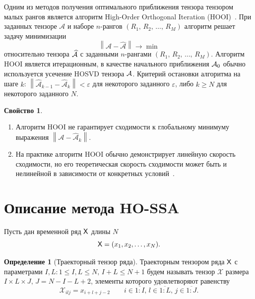 \documentclass[specialist,
    substylefile = spbu.rtx,
    subf,href,colorlinks=true, 12pt]{disser}
\theoremstyle{plain}
\theoremstyle{definition}
\newtheorem{definition}{Определение}[section]
\newtheorem{property}{Свойство}[section]
\theoremstyle{remark}
\begin{document}
    Одним из методов получения оптимального приближения тензора тензором малых рангов является алгоритм
    High-Order Orthogonal Iteration (HOOI)~\cite{hooi, hooi-alg}.
    При заданных тензоре $\mathcal{A}$ и наборе $n$-рангов $(R_1,\, R_2,\, \ldots,\, R_M)$
    алгоритм решает задачу минимизации
    \[
        \left\|\mathcal{A}-\widehat{\mathcal{A}}\right\|\to \min
    \]
    относительно тензора $\widehat{\mathcal{A}}$ с заданными $n$-рангами $(R_1,\, R_2,\, \ldots,\, R_M)$.
    Алгоритм HOOI является итерационным, в качестве начального приближения $\mathcal{A}_0$ обычно используется
    усечение HOSVD тензора $\mathcal{A}$.
    Критерий остановки алгоритма на шаге $k$:
    $\left\|\widehat{\mathcal{A}}_{k-1}-\widehat{\mathcal{A}}_k\right\| < \varepsilon$ 
    для некоторого заданного $\varepsilon$, либо $k \geqslant N$ для некоторого заданного $N$.
    \begin{property}
        \label{property:hooi-properties}
        \leavevmode
        \begin{enumerate}
            \item Алгоритм HOOI не гарантирует сходимости к глобальному минимуму выражения
            $\left\|\mathcal{A}-\widehat{\mathcal{A}}_k\right\|$.
            \item На практике алгоритм HOOI обычно демонстрирует линейную скорость сходимости, но его теоретическая скорость сходимости может быть и нелинейной в зависимости от конкретных
            условий~\cite{hooi-convergence}.
        \end{enumerate}
    \end{property}
   


    \section{Описание метода HO-SSA}\label{sec:HO-SSA-method-description}
    Пусть дан временной ряд $\mathsf{X}$ длины $N$
    \[
        \mathsf{X}=(x_1,x_2,\ldots,x_N).
    \]
    \begin{definition}[Траекторный тензор ряда]
        Траекторным тензором ряда $\mathsf{X}$ с параметрами $I,L: 1\leqslant I,L \leqslant N,\, I + L \leqslant N + 1$
        будем называть тензор $\mathcal{X}$ размера $I\times L \times J,\, J=N-I-L+2$, элементы которого удовлетворяют равенству
        \[
            \mathcal{X}_{ilj}=x_{i+l+j-2}\qquad i\in \overline{1:I},\, l \in\overline{1:L},\, j \in\overline{1:J}.
        \]
    \end{definition}
    
\end{document}
